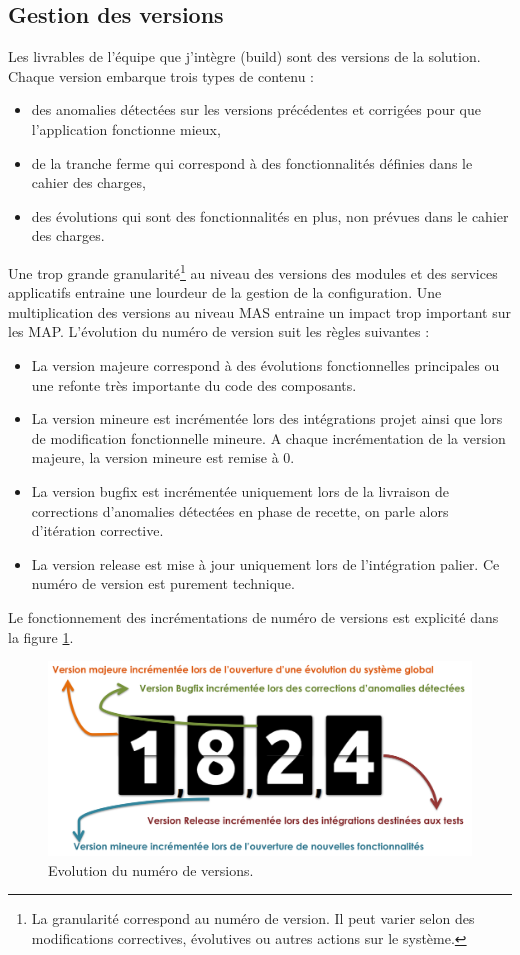 \documentclass[12pt,a4paper]{article}
\begin{document}
\subsection{Gestion des versions}
Les livrables de l'équipe que j'intègre (build) sont des versions de la solution. Chaque version embarque trois types de contenu :
\smallbreak
\begin{itemize}
\item des anomalies détectées sur les versions précédentes et corrigées pour que l’application fonctionne mieux,
\item de la tranche ferme qui correspond à des fonctionnalités définies dans le cahier des charges,
\item des évolutions qui sont des fonctionnalités en plus, non prévues dans le cahier des charges.
\end{itemize}
\medbreak
Une trop grande granularité\footnote{La granularité correspond au numéro de version. Il peut varier selon des modifications correctives, évolutives ou autres actions sur le système.} au niveau des versions des modules et des services applicatifs entraine une lourdeur de la gestion de la configuration. Une multiplication des versions au niveau MAS entraine un impact trop important sur les \gls{MAP}.
\smallbreak
L’évolution du numéro de version suit les règles suivantes :
\smallbreak
\begin{itemize}
\item	La version majeure correspond à des évolutions fonctionnelles principales ou une refonte très importante du code des composants.
\item	La version mineure est incrémentée lors des intégrations projet ainsi que lors de modification fonctionnelle mineure. A chaque incrémentation de la version majeure, la version mineure est remise à 0. 
\item	La version bugfix est incrémentée uniquement lors de la livraison de corrections d’anomalies détectées en phase de recette, on parle alors d'itération corrective.
\item	La version release est mise à jour uniquement lors de l’intégration palier. Ce numéro de version est purement technique.
\end{itemize}
\medbreak
Le fonctionnement des incrémentations de numéro de versions est explicité dans la figure \ref{versions}.
\begin{figure}[!hp]
		\begin{center}
			\includegraphics[width=\textwidth,keepaspectratio]{versions.png}
			\caption{Evolution du numéro de versions.}
			\label{versions}
		\end{center}
\end{figure}
\medbreak
\clearpage
\newpage
\end{document}
